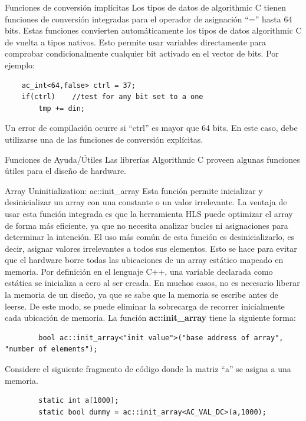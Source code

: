 \documentclass[11pt]{beamer}
\begin{document}
	\begin{frame}[fragile]{Funciones de conversión implícitas}
	\justifying \footnotesize
	Los tipos de datos de algorithmic C tienen funciones de conversión integradas para el operador de asignación ``='' hasta 64 bits. Estas funciones convierten automáticamente los tipos de datos algorithmic C de vuelta a tipos nativos. Esto permite usar variables directamente para comprobar condicionalmente cualquier bit activado en el vector de bits. Por ejemplo:
	\begin{lstlisting}
	ac_int<64,false> ctrl = 37;
	if(ctrl)	//test for any bit set to a one
		tmp += din;
	\end{lstlisting}
		
	\begin{framed}
	Un error de compilación ocurre si ``ctrl'' es mayor que 64 bits. En este caso, debe utilizarse una de las funciones de conversión explícitas.
	\end{framed}
	\end{frame}
	
	\begin{frame}{Funciones de Ayuda/Útiles}
	Las librerías Algorithmic C proveen algunas funciones útiles para el diseño de hardware.
	\end{frame}
	
	\begin{frame}[fragile]{Array Uninitialization: ac::init\_array}
		\justifying \footnotesize
		Esta función permite inicializar y desinicializar un array con una constante o un valor irrelevante. La ventaja de usar esta función integrada es que la herramienta HLS puede optimizar el array de forma más eficiente, ya que no necesita analizar bucles ni asignaciones para determinar la intención. El uso más común de esta función es desinicializarlo, es decir, asignar valores irrelevantes a todos sus elementos. Esto se hace para evitar que el hardware borre todas las ubicaciones de un array estático mapeado en memoria. Por definición en el lenguaje C++, una variable declarada como estática se inicializa a cero al ser creada. En muchos casos, no es necesario liberar la memoria de un diseño, ya que se sabe que la memoria se escribe antes de leerse. De este modo, se puede eliminar la sobrecarga de recorrer inicialmente cada ubicación de memoria. La función \textbf{ac::init\_array} tiene la siguiente forma:
		\begin{lstlisting}
		bool ac::init_array<"init value">("base address of array", "number of elements");
		\end{lstlisting}
		Considere el siguiente fragmento de código donde la matriz ``a'' se asigna a una memoria.
		
		\begin{lstlisting}
		static int a[1000];
		static bool dummy = ac::init_array<AC_VAL_DC>(a,1000);
		\end{lstlisting}
		
	\end{frame}
	
\end{document}
